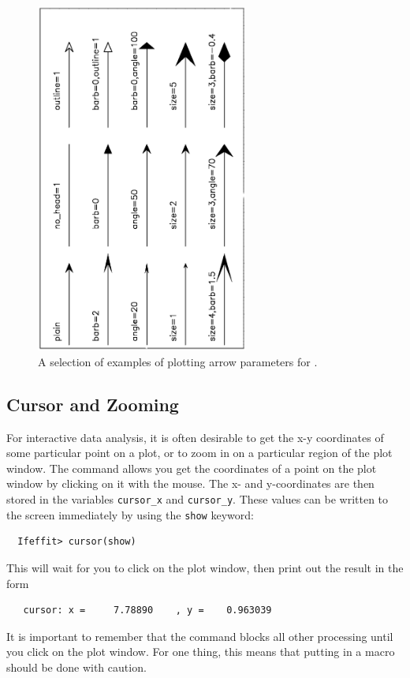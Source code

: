 \begin{figure}[tb] \begin{center}
  \includegraphics[width=2.75in,angle=-90]{figs/plot_arrows.ps}
  \caption{ A selection of examples of plotting arrow parameters
 for {\ifeffit}.}\label{Fig:PlotArrows}
\end{center} \end{figure}

\subsection{Cursor and Zooming} \label{Ch:Plot-cursor}
{}
{}
{}

For interactive data analysis, it is often desirable to get the x-y
coordinates of some particular point on a plot, or to zoom in on a
particular region of the plot window.  The {} command allows
you get the coordinates of a point on the plot window by clicking on it
with the mouse.  The x- and y-coordinates are then stored in the {\ifeffit}
variables {\tt{cursor\_x}} and {\tt{cursor\_y}}.  These values can be
written to the screen immediately by using the {\tt{show}} keyword:
\begin{verbatim}
  Ifeffit> cursor(show)
\end{verbatim}
\noindent
This will wait for you to click on the plot window, then print out
the result in the form
\begin{verbatim}
   cursor: x =     7.78890    , y =    0.963039
\end{verbatim}
\noindent
It is important to remember that the {} command blocks all
other processing until you click on the plot window.  For one thing, this
means that putting {} in a macro should be done with caution.

